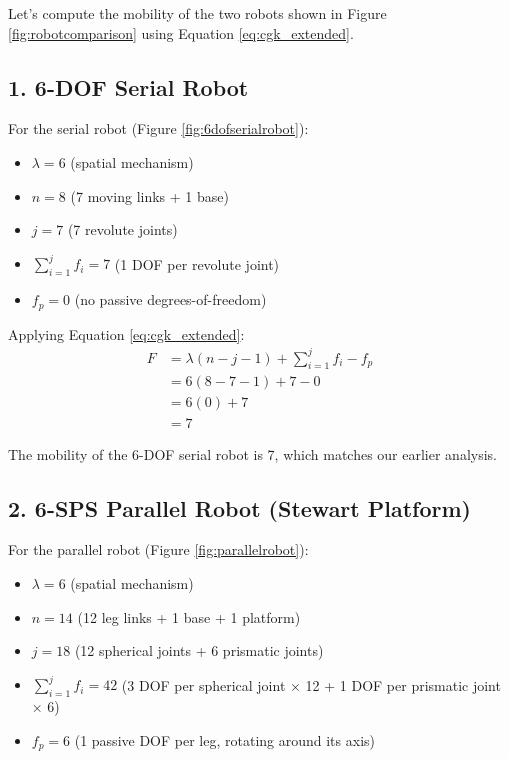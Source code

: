 \begin{solution}
    Let's compute the mobility of the two robots shown in Figure \ref{fig:robotcomparison} using Equation \ref{eq:cgk_extended}.

    \subsection*{1. 6-DOF Serial Robot}
    For the serial robot (Figure \ref{fig:6dofserialrobot}):
    \begin{itemize}
        \item $\lambda = 6$ (spatial mechanism)
        \item $n = 8$ (7 moving links + 1 base)
        \item $j = 7$ (7 revolute joints)
        \item $\sum_{i=1}^j f_i = 7$ (1 DOF per revolute joint)
        \item $f_p = 0$ (no passive degrees-of-freedom)
    \end{itemize}

    Applying Equation \ref{eq:cgk_extended}:
    \begin{align*}
        F &= \lambda(n - j - 1) + \sum_{i=1}^j f_i - f_p \\
          &= 6(8 - 7 - 1) + 7 - 0 \\
          &= 6(0) + 7 \\
          &= 7
    \end{align*}

    The mobility of the 6-DOF serial robot is 7, which matches our earlier analysis.

    \subsection*{2. 6-SPS Parallel Robot (Stewart Platform)}
    For the parallel robot (Figure \ref{fig:parallelrobot}):
    \begin{itemize}
        \item $\lambda = 6$ (spatial mechanism)
        \item $n = 14$ (12 leg links + 1 base + 1 platform)
        \item $j = 18$ (12 spherical joints + 6 prismatic joints)
        \item $\sum_{i=1}^j f_i = 42$ (3 DOF per spherical joint × 12 + 1 DOF per prismatic joint × 6)
        \item $f_p = 6$ (1 passive DOF per leg, rotating around its axis)
    \end{itemize}


\end{solution}
